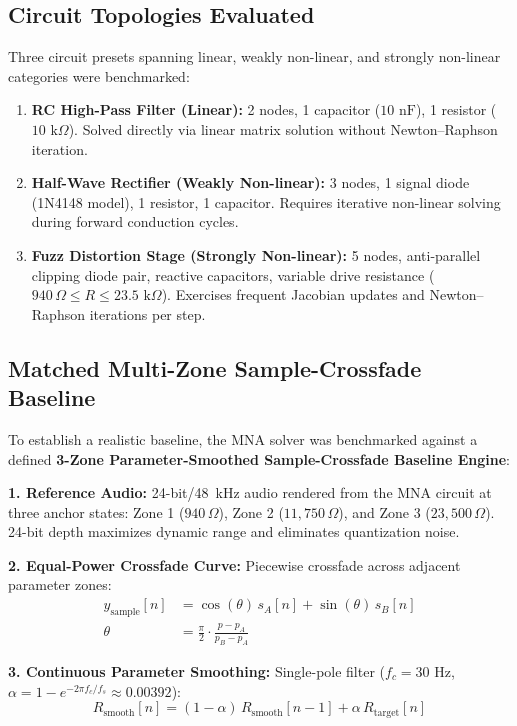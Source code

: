 \documentclass[fleqn,final]{jaes}
\begin{document}
\subsection{Circuit Topologies Evaluated}
Three circuit presets spanning linear, weakly non-linear, and strongly non-linear categories were benchmarked:
\begin{enumerate}\setlength{\itemsep}{1.2pt}\setlength{\parsep}{0pt}
\item \textbf{RC High-Pass Filter (Linear):} 2 nodes, 1 capacitor ($10\text{ nF}$), 1 resistor ($10\text{ k}\Omega$). Solved directly via linear matrix solution without Newton--Raphson iteration.
\item \textbf{Half-Wave Rectifier (Weakly Non-linear):} 3 nodes, 1 signal diode (1N4148 model), 1 resistor, 1 capacitor. Requires iterative non-linear solving during forward conduction cycles.
\item \textbf{Fuzz Distortion Stage (Strongly Non-linear):} 5 nodes, anti-parallel clipping diode pair, reactive capacitors, variable drive resistance ($940\,\Omega \le R \le 23.5\text{ k}\Omega$). Exercises frequent Jacobian updates and Newton--Raphson iterations per step.
\end{enumerate}

\subsection{Matched Multi-Zone Sample-Crossfade Baseline}
To establish a realistic baseline, the MNA solver was benchmarked against a defined \textbf{3-Zone Parameter-Smoothed Sample-Crossfade Baseline Engine}:

\noindent\textbf{1. Reference Audio:} 24-bit/48~kHz audio rendered from the MNA circuit at three anchor states: Zone 1 ($940\,\Omega$), Zone 2 ($11,750\,\Omega$), and Zone 3 ($23,500\,\Omega$). 24-bit depth maximizes dynamic range and eliminates quantization noise.

\noindent\textbf{2. Equal-Power Crossfade Curve:} Piecewise crossfade across adjacent parameter zones:
\begin{equation}
\begin{aligned}
y_{\text{sample}}[n] &= \cos(\theta) \, s_A[n] + \sin(\theta) \, s_B[n] \\
\theta &= \frac{\pi}{2} \cdot \frac{p - p_A}{p_B - p_A}
\end{aligned}
\end{equation}

\noindent\textbf{3. Continuous Parameter Smoothing:} Single-pole filter ($f_c = 30\text{ Hz}$, $\alpha = 1 - e^{-2\pi f_c / f_s} \approx 0.00392$):
\begin{equation}
R_{\text{smooth}}[n] = (1 - \alpha) \, R_{\text{smooth}}[n-1] + \alpha \, R_{\text{target}}[n]
\end{equation}
\end{document}
